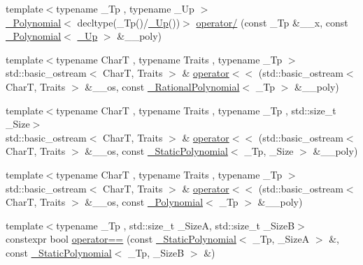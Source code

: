 \begin{DoxyCompactItemize}
\item 
{\footnotesize template$<$typename \+\_\+\+Tp , typename \+\_\+\+Up $>$ }\\\hyperlink{class____gnu__cxx_1_1__Polynomial}{\+\_\+\+Polynomial}$<$ decltype(\+\_\+\+Tp()/\hyperlink{namespace____gnu__cxx_ab693ea357b6429b331e0bf09f9442385}{\+\_\+\+Up}())$>$ \hyperlink{namespace____gnu__cxx_a4c1b4c46ffc6c41fb5b5d1a4293ca563}{operator/} (const \+\_\+\+Tp \&\+\_\+\+\_\+x, const \hyperlink{class____gnu__cxx_1_1__Polynomial}{\+\_\+\+Polynomial}$<$ \hyperlink{namespace____gnu__cxx_ab693ea357b6429b331e0bf09f9442385}{\+\_\+\+Up} $>$ \&\+\_\+\+\_\+poly)
\item 
{\footnotesize template$<$typename CharT , typename Traits , typename \+\_\+\+Tp $>$ }\\std\+::basic\+\_\+ostream$<$ CharT, Traits $>$ \& \hyperlink{namespace____gnu__cxx_a424044092ac184bfa1d17beb1b12e071}{operator$<$$<$} (std\+::basic\+\_\+ostream$<$ CharT, Traits $>$ \&\+\_\+\+\_\+os, const \hyperlink{class____gnu__cxx_1_1__RationalPolynomial}{\+\_\+\+Rational\+Polynomial}$<$ \+\_\+\+Tp $>$ \&\+\_\+\+\_\+poly)
\item 
{\footnotesize template$<$typename CharT , typename Traits , typename \+\_\+\+Tp , std\+::size\+\_\+t \+\_\+\+Size$>$ }\\std\+::basic\+\_\+ostream$<$ CharT, Traits $>$ \& \hyperlink{namespace____gnu__cxx_a143c7d2302fc613fd818f9149707b753}{operator$<$$<$} (std\+::basic\+\_\+ostream$<$ CharT, Traits $>$ \&\+\_\+\+\_\+os, const \hyperlink{class____gnu__cxx_1_1__StaticPolynomial}{\+\_\+\+Static\+Polynomial}$<$ \+\_\+\+Tp, \+\_\+\+Size $>$ \&\+\_\+\+\_\+poly)
\item 
{\footnotesize template$<$typename CharT , typename Traits , typename \+\_\+\+Tp $>$ }\\std\+::basic\+\_\+ostream$<$ CharT, Traits $>$ \& \hyperlink{namespace____gnu__cxx_ad713743dbfc30fba653621d1f7e99d3c}{operator$<$$<$} (std\+::basic\+\_\+ostream$<$ CharT, Traits $>$ \&\+\_\+\+\_\+os, const \hyperlink{class____gnu__cxx_1_1__Polynomial}{\+\_\+\+Polynomial}$<$ \+\_\+\+Tp $>$ \&\+\_\+\+\_\+poly)
\item 
{\footnotesize template$<$typename \+\_\+\+Tp , std\+::size\+\_\+t \+\_\+\+SizeA, std\+::size\+\_\+t \+\_\+\+SizeB$>$ }\\constexpr bool \hyperlink{namespace____gnu__cxx_a316d841c3d2addecec46960379815cd4}{operator==} (const \hyperlink{class____gnu__cxx_1_1__StaticPolynomial}{\+\_\+\+Static\+Polynomial}$<$ \+\_\+\+Tp, \+\_\+\+SizeA $>$ \&, const \hyperlink{class____gnu__cxx_1_1__StaticPolynomial}{\+\_\+\+Static\+Polynomial}$<$ \+\_\+\+Tp, \+\_\+\+SizeB $>$ \&)

\end{DoxyCompactItemize}
